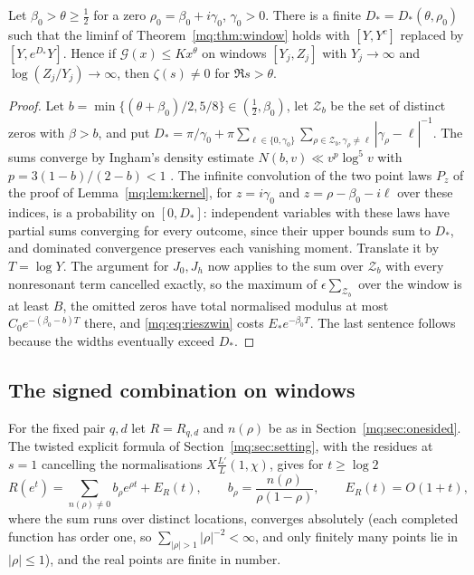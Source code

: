 \begin{corollary}\label{mq:cor:logwindow}
Let $\beta_0>\theta\ge\frac12$ for a zero $\rho_0=\beta_0+i\gamma_0$, $\gamma_0>0$. There is a finite $D_*=D_*(\theta,\rho_0)$ such that the liminf of Theorem~\ref{mq:thm:window} holds with $[Y,Y^c]$ replaced by $[Y,e^{D_*}Y]$. Hence if $\mathcal G(x)\le Kx^\theta$ on windows $[Y_j,Z_j]$ with $Y_j\to\infty$ and $\log(Z_j/Y_j)\to\infty$, then $\zeta(s)\ne0$ for $\Re s>\theta$.
\end{corollary}

\begin{proof}
Let $b=\min\{(\theta+\beta_0)/2,5/8\}\in(\frac12,\beta_0)$, let $\mathcal Z_b$ be the set of distinct zeros with $\beta>b$, and put $D_*=\pi/\gamma_0+\pi\sum_{\ell\in\{0,\gamma_0\}}\sum_{\rho\in\mathcal Z_b,\gamma_\rho\ne\ell}|\gamma_\rho-\ell|^{-1}$. The sums converge by Ingham's density estimate $N(b,v)\ll v^{p}\log^5v$ with $p=3(1-b)/(2-b)<1$ \cite{Titchmarsh}. The infinite convolution of the two point laws $P_z$ of the proof of Lemma~\ref{mq:lem:kernel}, for $z=i\gamma_0$ and $z=\rho-\beta_0-i\ell$ over these indices, is a probability on $[0,D_*]$: independent variables with these laws have partial sums converging for every outcome, since their upper bounds sum to $D_*$, and dominated convergence preserves each vanishing moment. Translate it by $T=\log Y$. The argument for $J_0,J_h$ now applies to the sum over $\mathcal Z_b$ with every nonresonant term cancelled exactly, so the maximum of $\epsilon\sum_{\mathcal Z_b}$ over the window is at least $B$, the omitted zeros have total normalised modulus at most $C_0e^{-(\beta_0-b)T}$ there, and \eqref{mq:eq:rieszwin} costs $E_*e^{-\beta_0T}$. The last sentence follows because the widths eventually exceed $D_*$.
\end{proof}

\subsection{The signed combination on windows}

For the fixed pair $q,d$ let $R=R_{q,d}$ and $n(\rho)$ be as in Section~\ref{mq:sec:onesided}. The twisted explicit formula of Section~\ref{mq:sec:setting}, with the residues at $s=1$ cancelling the normalisations $X\frac{L'}L(1,\chi)$, gives for $t\ge\log2$
\[
R(e^t)=\sum_{n(\rho)\ne0}b_\rho e^{\rho t}+E_R(t),\qquad b_\rho=\frac{n(\rho)}{\rho(1-\rho)},\qquad E_R(t)=O(1+t),
\]
where the sum runs over distinct locations, converges absolutely (each completed function has order one, so $\sum_{|\rho|>1}|\rho|^{-2}<\infty$, and only finitely many points lie in $|\rho|\le1$), and the real points are finite in number.

